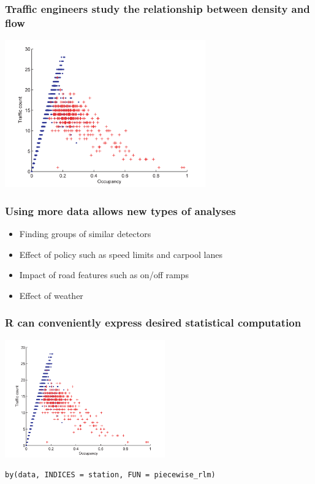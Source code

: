 \documentclass{beamer}
\begin{document}
\begin{frame}

    \frametitle{Traffic engineers study the relationship between 
    density and flow \cite{li2011fundamental}}

\centerline{\includegraphics[height=2.5in]{fundamental_diagram.png}}

\end{frame}
\begin{frame}

    \frametitle{Using more data allows new types of analyses}

    \begin{itemize}
        \item Finding groups of similar detectors
        \item Effect of policy such as speed limits and carpool lanes
        \item Impact of road features such as on/off ramps
        \item Effect of weather
    \end{itemize}

\end{frame}
\begin{frame}[fragile]

    \frametitle{R can conveniently express desired statistical computation}

\centerline{\includegraphics[height=2in]{fundamental_diagram.png}}

\begin{verbatim}
by(data, INDICES = station, FUN = piecewise_rlm)
\end{verbatim}

\end{frame}
\end{document}
